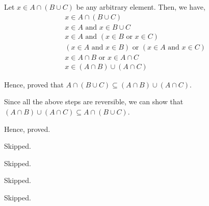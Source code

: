 \begin{solution}
	Let $x \in A \cap (B \cup C)$ be any arbitrary element. Then, we have,
	\begin{align}
		&x \in A \cap (B \cup C) \\
		&x \in A \text{ and } x \in B \cup C \\
		&x \in A \text{ and } ( x \in B \text{ or } x \in C ) \\
		&(x \in A \text{ and } x \in B) \text{ or } (x \in A \text{ and } x \in C) \\
		&x \in A \cap B \text{ or } x \in A \cap C \\
		&x \in (A \cap B) \cup (A \cap C)
	\end{align}

	Hence, proved that $A \cap (B \cup C) \subseteq (A \cap B) \cup (A \cap C)$.

	Since all the above steps are reversible, we can show that 
	$(A \cap B) \cup (A \cap C) \subseteq A \cap (B \cup C)$.

	Hence, proved.
\end{solution}


\begin{problem}Skipped.\end{problem}
\begin{problem}Skipped.\end{problem}
\begin{problem}Skipped.\end{problem}
\begin{problem}Skipped.\end{problem}

